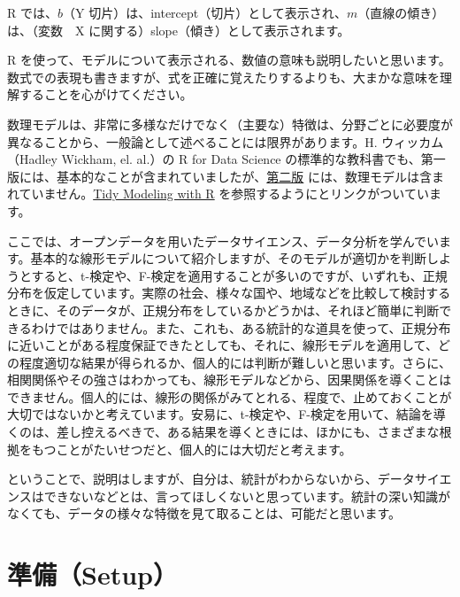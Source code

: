 \documentclass[
  xelatex, ja=standard]{bxjsbook}
\theoremstyle{definition}
\theoremstyle{definition}
\theoremstyle{definition}
\theoremstyle{definition}
\theoremstyle{remark}
\begin{document}
R では、\(b\)（Y 切片）は、intercept（切片）として表示され、\(m\)（直線の傾き）は、（変数　X に関する）slope（傾き）として表示されます。

R を使って、モデルについて表示される、数値の意味も説明したいと思います。数式での表現も書きますが、式を正確に覚えたりするよりも、大まかな意味を理解することを心がけてください。

数理モデルは、非常に多様なだけでなく（主要な）特徴は、分野ごとに必要度が異なることから、一般論として述べることには限界があります。H. ウィッカム（Hadley Wickham, el. al.）の R for Data Science の標準的な教科書でも、第一版には、基本的なことが含まれていましたが、\href{https://r4ds.hadley.nz}{第二版} には、数理モデルは含まれていません。\href{https://www.tmwr.org}{Tidy Modeling with R} を参照するようにとリンクがついています。

ここでは、オープンデータを用いたデータサイエンス、データ分析を学んでいます。基本的な線形モデルについて紹介しますが、そのモデルが適切かを判断しようとすると、t-検定や、F-検定を適用することが多いのですが、いずれも、正規分布を仮定しています。実際の社会、様々な国や、地域などを比較して検討するときに、そのデータが、正規分布をしているかどうかは、それほど簡単に判断できるわけではありません。また、これも、ある統計的な道具を使って、正規分布に近いことがある程度保証できたとしても、それに、線形モデルを適用して、どの程度適切な結果が得られるか、個人的には判断が難しいと思います。さらに、相関関係やその強さはわかっても、線形モデルなどから、因果関係を導くことはできません。個人的には、線形の関係がみてとれる、程度で、止めておくことが大切ではないかと考えています。安易に、t-検定や、F-検定を用いて、結論を導くのは、差し控えるべきで、ある結果を導くときには、ほかにも、さまざまな根拠をもつことがたいせつだと、個人的には大切だと考えます。

ということで、説明はしますが、自分は、統計がわからないから、データサイエンスはできないなどとは、言ってほしくないと思っています。統計の深い知識がなくても、データの様々な特徴を見て取ることは、可能だと思います。

\hypertarget{ux6e96ux5099setup}{%
\section{準備（Setup）}\label{ux6e96ux5099setup}}
\end{document}
